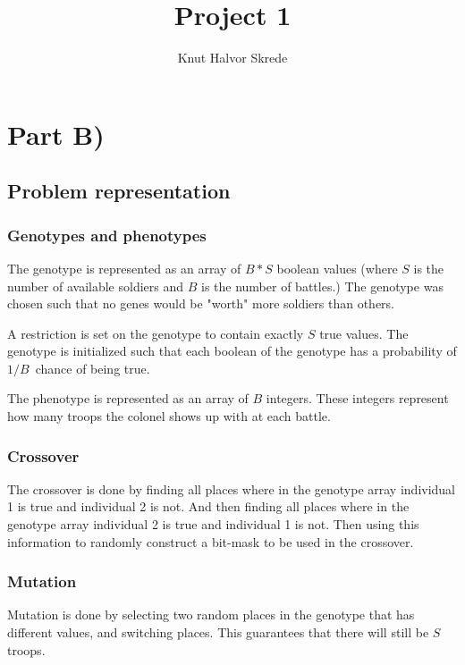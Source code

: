 \documentclass[11pt]{article}
\title{Project 1}
\author{Knut Halvor Skrede}
\begin{document}
\maketitle
\clearpage

\section*{Part B)}

\subsection*{Problem representation}

\subsubsection*{Genotypes and phenotypes}

The genotype is represented as an array of $B*S$ boolean values (where $S$ is the number of available
soldiers and $B$ is the number of battles.) The genotype was chosen such that no genes would be "worth"
more soldiers than others.

A restriction is set on the genotype to contain exactly $S$ true values. The genotype is initialized 
such that each boolean of the genotype has a probability of $1/B$ chance of being true.

The phenotype is represented as an array of $B$ integers. These integers represent how many troops 
the colonel shows up with at each battle.

\subsubsection*{Crossover}

The crossover is done by finding all places where in the genotype array individual 1 is true and individual 2 is not.
And then finding all places where in the genotype array individual 2 is true and individual 1 is not. Then using this
information to randomly construct a bit-mask to be used in the crossover.

\subsubsection*{Mutation}

Mutation is done by selecting two random places in the genotype that has different values, and switching places.
This guarantees that there will still be $S$ troops.
\end{document}
